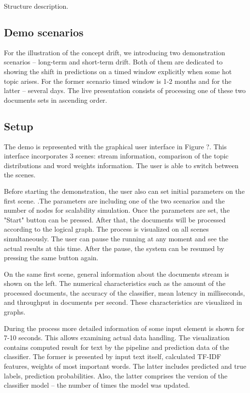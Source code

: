 
Structure description.

\subsection{Demo scenarios}

For the illustration of the concept drift, we introducing two demonstration scenarios -- long-term and short-term drift. Both of them are dedicated to showing the shift in predictions on a timed window explicitly when some hot topic arises. For the former scenario timed window is 1-2 months and for the latter -- several days. The live presentation consists of processing one of these two documents sets in ascending order. 

\subsection{Setup}

The demo is represented with the graphical user interface in Figure ?. This interface incorporates 3 scenes: stream information, comparison of the topic distributions and word weights information. The user is able to switch between the scenes. 

Before starting the demonstration, the user also can set initial parameters on the first scene. .The parameters are including one of the two scenarios and the number of nodes for scalability simulation. Once the parameters are set, the "Start" button can be pressed. After that, the documents will be processed according to the logical graph. The process is visualized on all scenes simultaneously. The user can pause the running at any moment and see the actual results at this time. After the pause, the system can be resumed by pressing the same button again.

On the same first scene, general information about the documents stream is shown on the left. The numerical characteristics such as the amount of the processed documents, the accuracy of the classifier, mean latency in milliseconds, and throughput in documents per second. These characteristics are visualized in graphs.

During the process more detailed information of some input element is shown for 7-10 seconds. This allows examining actual data handling. The visualization contains computed result for text by the pipeline and prediction data of the classifier. The former is presented by input text itself, calculated TF-IDF features, weights of most important words. The latter includes predicted and true labels, prediction probabilities. Also, the latter comprises the version of the classifier model -- the number of times the model was updated.


